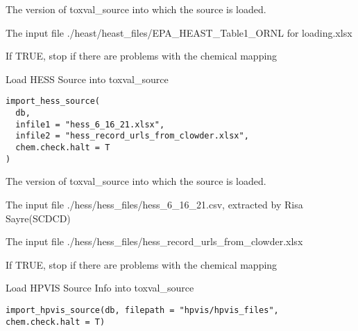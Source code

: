 \documentclass[letterpaper]{book}
\begin{document}
%
\begin{Arguments}
\begin{ldescription}
\item[\code{db}] The version of toxval\_source into which the source is loaded.

\item[\code{infile}] The input file ./heast/heast\_files/EPA\_HEAST\_Table1\_ORNL for loading.xlsx

\item[\code{chem.check.halt}] If TRUE, stop if there are problems with the chemical mapping
\end{ldescription}
\end{Arguments}
%
\begin{Description}\relax
Load HESS Source into toxval\_source
\end{Description}
%
\begin{Usage}
\begin{verbatim}
import_hess_source(
  db,
  infile1 = "hess_6_16_21.xlsx",
  infile2 = "hess_record_urls_from_clowder.xlsx",
  chem.check.halt = T
)
\end{verbatim}
\end{Usage}
%
\begin{Arguments}
\begin{ldescription}
\item[\code{db}] The version of toxval\_source into which the source is loaded.

\item[\code{infile1}] The input file ./hess/hess\_files/hess\_6\_16\_21.csv, extracted by Risa Sayre(SCDCD)

\item[\code{infile2}] The input file ./hess/hess\_files/hess\_record\_urls\_from\_clowder.xlsx

\item[\code{chem.check.halt}] If TRUE, stop if there are problems with the chemical mapping
\end{ldescription}
\end{Arguments}
%
\begin{Description}\relax
Load HPVIS Source Info into toxval\_source
\end{Description}
%
\begin{Usage}
\begin{verbatim}
import_hpvis_source(db, filepath = "hpvis/hpvis_files", chem.check.halt = T)
\end{verbatim}
\end{Usage}
\end{document}
